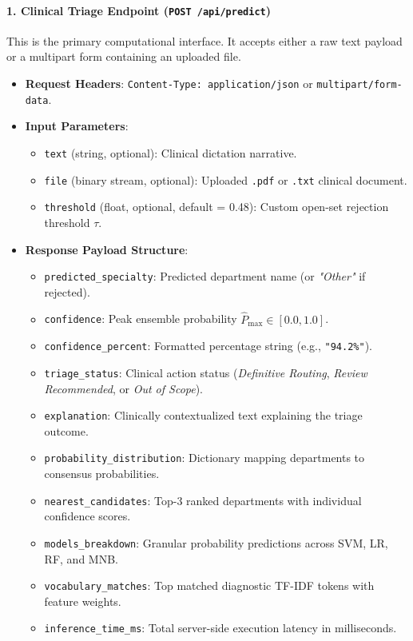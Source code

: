 \paragraph{1. Clinical Triage Endpoint (\texttt{POST /api/predict})}
This is the primary computational interface. It accepts either a raw text payload or a multipart form containing an uploaded file.
\begin{itemize}
    \item \textbf{Request Headers}: \texttt{Content-Type: application/json} or \texttt{multipart/form-data}.
    \item \textbf{Input Parameters}:
    \begin{itemize}
        \item \texttt{text} (string, optional): Clinical dictation narrative.
        \item \texttt{file} (binary stream, optional): Uploaded \texttt{.pdf} or \texttt{.txt} clinical document.
        \item \texttt{threshold} (float, optional, default = 0.48): Custom open-set rejection threshold $\tau$.
    \end{itemize}
    \item \textbf{Response Payload Structure}:
    \begin{itemize}
        \item \texttt{predicted\_specialty}: Predicted department name (or \textit{"Other"} if rejected).
        \item \texttt{confidence}: Peak ensemble probability $\hat{P}_{\text{max}} \in [0.0, 1.0]$.
        \item \texttt{confidence\_percent}: Formatted percentage string (e.g., \texttt{"94.2\%"}).
        \item \texttt{triage\_status}: Clinical action status (\textit{Definitive Routing}, \textit{Review Recommended}, or \textit{Out of Scope}).
        \item \texttt{explanation}: Clinically contextualized text explaining the triage outcome.
        \item \texttt{probability\_distribution}: Dictionary mapping departments to consensus probabilities.
        \item \texttt{nearest\_candidates}: Top-3 ranked departments with individual confidence scores.
        \item \texttt{models\_breakdown}: Granular probability predictions across SVM, LR, RF, and MNB.
        \item \texttt{vocabulary\_matches}: Top matched diagnostic TF-IDF tokens with feature weights.
        \item \texttt{inference\_time\_ms}: Total server-side execution latency in milliseconds.
    \end{itemize}
\end{itemize}

